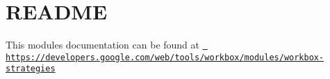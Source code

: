 \chapter{README}
\hypertarget{md_node__modules_2workbox-strategies_2README}{}\label{md_node__modules_2workbox-strategies_2README}
This module\textquotesingle{}s documentation can be found at \href{https://developers.google.com/web/tools/workbox/modules/workbox-strategies}{\texttt{ https\+://developers.\+google.\+com/web/tools/workbox/modules/workbox-\/strategies}} 